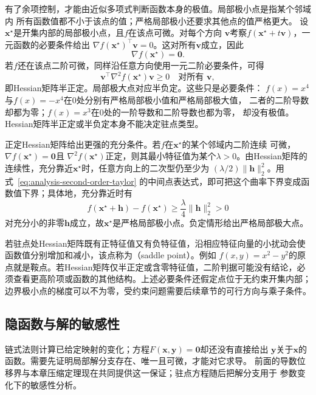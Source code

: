 有了余项控制，才能由近似多项式判断函数本身的极值。局部极小点是指某个邻域内
所有函数值都不小于该点的值；严格局部极小还要求其他点的值严格更大。
设$\bm{x}^{\star}$是开集内部的局部极小点，且$f$在该点可微。对每个方向 $\bm{v}$考察$f(\bm{x}^{\star}+t\bm{v})$，一元函数的必要条件给出 $\nabla f(\bm{x}^{\star})^{\top}\bm{v}=0$。这对所有$\bm{v}$成立，因此
\begin{equation}
  \nabla f(\bm{x}^{\star})=\bm{0}.
\label{eq:analysis-first-order-necessary}
\end{equation}
若$f$还在该点二阶可微，同样沿任意方向使用一元二阶必要条件，可得
\begin{equation}
  \bm{v}^{\top}\nabla^2f(\bm{x}^{\star})\bm{v}\geq0
  \quad\text{对所有 }\bm{v},
\label{eq:analysis-second-order-necessary}
\end{equation}
即Hessian矩阵半正定。局部极大点对应半负定。这些只是必要条件：
$f(x)=x^4$与$f(x)=-x^4$在$0$处分别有严格局部极小值和严格局部极大值，
二者的二阶导数却都为零；$f(x)=x^3$在$0$处的一阶导数和二阶导数也都为零，
却没有极值。Hessian矩阵半正定或半负定本身不能决定驻点类型。

正定Hessian矩阵给出更强的充分条件。若$f$在$\bm{x}^{\star}$的某个邻域内二阶连续
可微，$\nabla f(\bm{x}^{\star})=\bm{0}$且
$\nabla^2f(\bm{x}^{\star})$正定，则其最小特征值为某个$\lambda>0$。由Hessian矩阵的
连续性，充分靠近$\bm{x}^{\star}$时，任意方向上的二次型仍至少为
$(\lambda/2)\lVert\bm{h}\rVert_2^2$。用式~\eqref{eq:analysis-second-order-taylor}
的中间点表达式，即可把这个曲率下界变成函数值下界；具体地，充分靠近时有
\[   f(\bm{x}^{\star}+\bm{h})-f(\bm{x}^{\star})   \geq   \frac{\lambda}{4}\lVert\bm{h}\rVert_2^2>0 \]
对充分小的非零$\bm{h}$成立，故$\bm{x}^{\star}$是严格局部极小点。负定情形给出严格局部极大点。

若驻点处Hessian矩阵既有正特征值又有负特征值，沿相应特征向量的小扰动会使函数值分别增加和减小，该点称为（saddle point）。例如 $f(x,y)=x^2-y^2$的原点就是鞍点。若Hessian矩阵仅半正定或含零特征值，二阶判据可能没有结论，必须查看更高阶项或函数的其他结构。上述必要条件还假定点位于无约束开集内部； 边界极小点的梯度可以不为零，受约束问题需要后续章节的可行方向与乘子条件。

\subsection{隐函数与解的敏感性}
\label{sec:analysis-implicit-parameter-integral}

链式法则计算已给定映射的变化；方程$F(\bm x,\bm y)=\bm0$却还没有直接给出
$\bm y$关于$\bm x$的函数。需要先证明局部解分支存在、唯一且可微，才能对它求导。
前面的导数位移界与本章压缩定理现在共同提供这一保证；驻点方程随后把解分支用于
参数变化下的敏感性分析。


